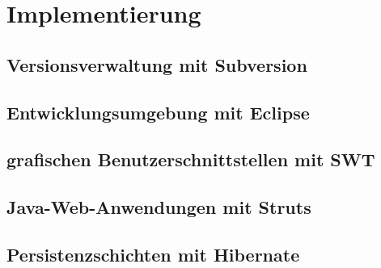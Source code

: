 \chapter{Implementierung} \label{sec:Implementierung}

\section{Versionsverwaltung mit Subversion}
		
\section{Entwicklungsumgebung mit Eclipse}

\section{grafischen Benutzerschnittstellen mit SWT}
		
\section{Java-Web-Anwendungen mit Struts}


\section{Persistenzschichten mit Hibernate}